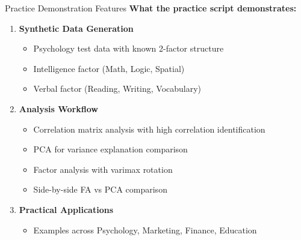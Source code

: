\documentclass[aspectratio=169]{beamer}
\begin{document}
\begin{frame}{Practice Demonstration Features}
  \textbf{What the practice script demonstrates:}
  \begin{enumerate}
    \item \textbf{Synthetic Data Generation}
    \begin{itemize}
      \item Psychology test data with known 2-factor structure
      \item Intelligence factor (Math, Logic, Spatial)  
      \item Verbal factor (Reading, Writing, Vocabulary)
    \end{itemize}
    
    \item \textbf{Analysis Workflow}
    \begin{itemize}
      \item Correlation matrix analysis with high correlation identification
      \item PCA for variance explanation comparison
      \item Factor analysis with varimax rotation
      \item Side-by-side FA vs PCA comparison
    \end{itemize}
    
    \item \textbf{Practical Applications}
    \begin{itemize}
      \item Examples across Psychology, Marketing, Finance, Education
    \end{itemize}
  \end{enumerate}
\end{frame}
\end{document}
